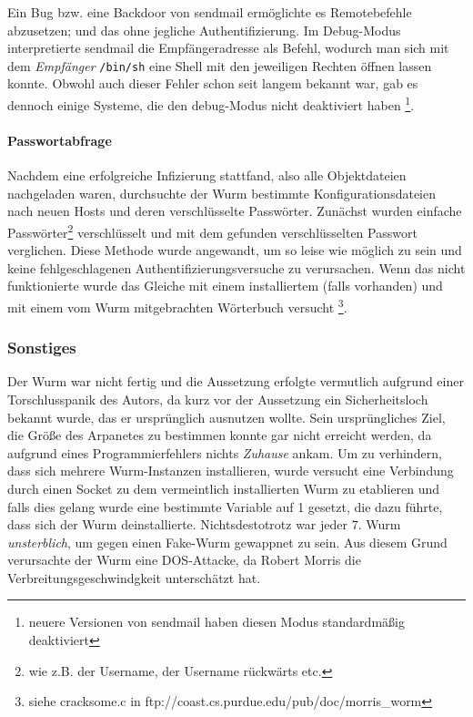 Ein Bug bzw. eine Backdoor von sendmail ermöglichte es Remotebefehle
abzusetzen; und das ohne jegliche Authentifizierung. Im Debug-Modus
interpretierte sendmail die Empfängeradresse als Befehl, wodurch man
sich mit dem \textit{Empfänger} \texttt{/bin/sh} eine Shell mit den
jeweiligen Rechten öffnen lassen konnte. Obwohl auch dieser Fehler
schon seit langem bekannt war, gab es dennoch einige Systeme, die den
debug-Modus nicht deaktiviert haben \footnote{neuere Versionen von
sendmail haben diesen Modus standardmäßig deaktiviert}.

\paragraph{Passwortabfrage}

Nachdem eine erfolgreiche Infizierung stattfand, also alle
Objektdateien nachgeladen waren, durchsuchte der Wurm bestimmte
Konfigurationsdateien nach neuen Hosts und deren verschlüsselte
Passwörter. Zunächst wurden einfache Passwörter\footnote{wie z.B. der
Username, der Username rückwärts etc.} verschlüsselt und mit dem
gefunden verschlüsselten Passwort verglichen. Diese Methode wurde
angewandt, um so leise wie möglich zu sein und keine fehlgeschlagenen
Authentifizierungsversuche zu verursachen. Wenn das nicht
funktionierte wurde das Gleiche mit einem installiertem (falls
vorhanden) und mit einem vom Wurm mitgebrachten Wörterbuch versucht
\footnote{siehe cracksome.c in
ftp://coast.cs.purdue.edu/pub/doc/morris\_worm}.

\subsubsection {Sonstiges}

Der Wurm war nicht fertig und die Aussetzung erfolgte vermutlich
aufgrund einer Torschlusspanik des Autors, da kurz vor der Aussetzung
ein Sicherheitsloch bekannt wurde, das er ursprünglich ausnutzen
wollte. Sein ursprüngliches Ziel, die Größe des Arpanetes zu bestimmen
konnte gar nicht erreicht werden, da aufgrund eines Programmierfehlers
nichts \textit{Zuhause} ankam. Um zu verhindern, dass sich mehrere
Wurm-Instanzen installieren, wurde versucht eine Verbindung durch
einen Socket zu dem vermeintlich installierten Wurm zu etablieren und
falls dies gelang wurde eine bestimmte Variable auf 1 gesetzt, die
dazu führte, dass sich der Wurm deinstallierte. Nichtsdestotrotz war
jeder 7. Wurm \textit{unsterblich}, um gegen einen Fake-Wurm gewappnet
zu sein. Aus diesem Grund verursachte der Wurm eine DOS-Attacke, da
Robert Morris die Verbreitungsgeschwindgkeit unterschätzt hat.

